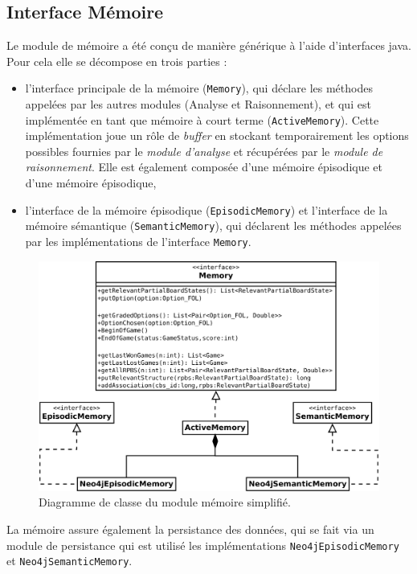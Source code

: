 \subsection{Interface Mémoire}

Le module de mémoire a été conçu de manière générique à l'aide d'interfaces java. Pour cela elle se décompose en trois parties :

\begin{itemize}
\item l'interface principale de la mémoire (\texttt{Memory}), qui déclare les méthodes appelées par les autres modules (Analyse et Raisonnement), et qui est implémentée en tant que mémoire à court terme (\texttt{ActiveMemory}). Cette implémentation joue un rôle de \emph{buffer} en stockant temporairement les options possibles fournies par le \emph{module d'analyse} et récupérées par le \emph{module de raisonnement}. Elle est également composée d'une mémoire épisodique et d'une mémoire épisodique,

\item l'interface de la mémoire épisodique (\texttt{EpisodicMemory}) et l'interface de la mémoire sémantique (\texttt{SemanticMemory}), qui déclarent les méthodes appelées par les implémentations de l'interface \texttt{Memory}.
\end{itemize}

\begin{figure}[H]
\includegraphics[width=\textwidth]{files/memoire/interface}
\caption{Diagramme de classe du module mémoire simplifié.}
\end{figure}

La mémoire assure également la persistance des données, qui se fait via un module de persistance qui est utilisé les implémentations \texttt{Neo4jEpisodicMemory} et \texttt{Neo4jSemanticMemory}. 


